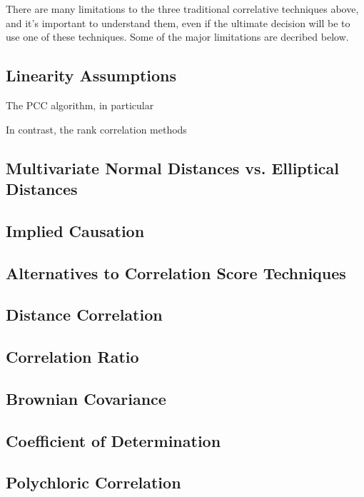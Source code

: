 There are many limitations to the three traditional correlative techniques above, and it's important to understand them, even if the ultimate decision will be to use one of these techniques. Some of the major limitations are decribed below.

\subsection{Linearity Assumptions}

The PCC algorithm, in particular

In contrast, the rank correlation methods 

\subsection{Multivariate Normal Distances vs. Elliptical Distances}

\subsection{Implied Causation}

\subsection{Alternatives to Correlation Score Techniques}



\subsection{Distance Correlation}

\subsection{Correlation Ratio}

\subsection{Brownian Covariance}

\subsection{Coefficient of Determination}

\subsection{Polychloric Correlation}